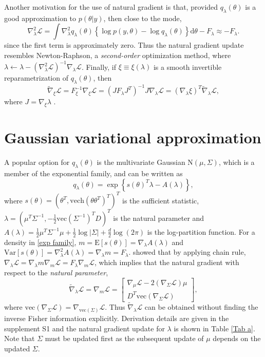 \documentclass{statsoc}
\newcommand\df{{\text{d}}}
\newcommand\E{{\text{E}}}
\newcommand\Var{{\text{Var}}}
\newcommand\mL{{\mathcal{L}}}
\newcommand\N{{\text{N}}}
\newcommand{\vc}{\text{vec}}
\newcommand{\vech}{\text{vech}}
\begin{document}
Another motivation for the use of natural gradient is that, provided $q_\lambda (\theta)$ is a good approximation to $p(\theta|y)$, then close to the mode,
\[
\nabla^2_\lambda \mL = \int \nabla_\lambda^2 q_\lambda(\theta) \left\{\log p(y, \theta) - \log q_\lambda(\theta) \right\}  \df \theta - F_\lambda \approx -F_\lambda.
\]
since the first term is approximately zero. Thus the natural gradient update resembles Newton-Raphson, a {\em second-order} optimization method, where $\lambda \leftarrow \lambda - (\nabla_\lambda^2 \mL)^{-1} \nabla_\lambda \mL$. Finally, if $\xi \equiv \xi(\lambda)$ is a smooth invertible reparametrization of $q_\lambda(\theta)$, then 
\begin{equation} \label{reparametrized natural gradient}
\widetilde{\nabla}_\xi \mL = F_\xi^{-1} \nabla_\xi \mL 
= ( J F_\lambda J^T )^{-1} J \nabla_\lambda \mL
= (\nabla_\lambda \xi)^T  \widetilde{\nabla}_\lambda \mL,
\end{equation}
where $J = \nabla_\xi \lambda$ \citep{Lehmann1998}. 



\section{Gaussian variational approximation} \label{sec_GVA}
A popular option for $q_\lambda(\theta)$ is the multivariate Gaussian $\N(\mu, \Sigma)$, which is a member of the exponential family, and can be written as
\begin{equation} \label{exp family}
q_\lambda(\theta) = \exp \left\{ s(\theta)^T  \lambda -  A(\lambda) \right\}, 
\end{equation}
where $s(\theta) = (\theta^T ,\vech(\theta\theta^T )^T )^T $ is the sufficient statistic, $\lambda = (\mu^T \Sigma^{-1},  -\frac{1}{2} \vc(\Sigma^{-1})^T D)^T $ is the natural parameter and $A(\lambda) = \tfrac{1}{2} \mu^T  \Sigma^{-1} \mu + \tfrac{1}{2} \log |\Sigma| + \frac{d}{2} \log(2\pi)$ is the log-partition function. For a density in \eqref{exp family}, $m = \E [s(\theta)] = \nabla_\lambda A(\lambda)$ and $\Var[s(\theta)] = \nabla_\lambda^2 A(\lambda)  = \nabla_\lambda m = F_\lambda$. \cite{Khan2017} showed that by applying chain rule,  $\nabla_{\lambda} \mL  = \nabla_\lambda m  \nabla_m \mL = F_\lambda \nabla_m \mL$, which implies that the natural gradient with respect to the {\em natural parameter},
\begin{equation*} 
\widetilde{\nabla}_\lambda \mL = \nabla_m \mL = \begin{bmatrix} \nabla_\mu \mL - 2(\nabla_{\Sigma}\mL) \mu \\ D^T  \vc(\nabla_{\Sigma} \mL)
 \end{bmatrix},
\end{equation*}
where $\vc(\nabla_{\Sigma} \mL) = \nabla_{\vc(\Sigma) } \mL$. Thus $\widetilde{\nabla}_\lambda \mL$ can be obtained without finding the inverse Fisher information explicitly. Derivation details are given in the supplement S1 and the natural gradient update for $\lambda$ is shown in Table \ref{Tab a}. Note that $\Sigma$ must be updated first as the subsequent update of $\mu$ depends on the updated $\Sigma$. 
\end{document}
